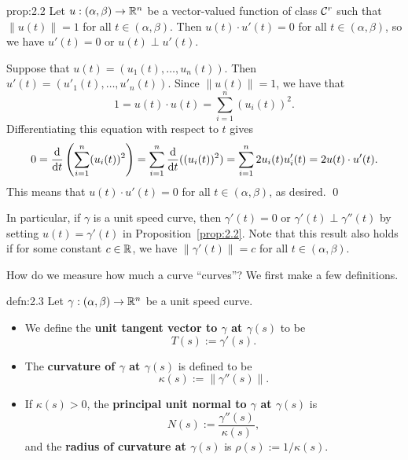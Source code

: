 \begin{prop}{prop:2.2}
    Let $u : (\alpha, \beta) \to \mathbb{R}^n$ be a vector-valued function of class ${\cal C}^r$ 
    such that $\|u(t)\| = 1$ for all $t \in (\alpha, \beta)$. Then 
    $u(t) \cdot u'(t) = 0$ for all $t \in (\alpha, \beta)$, so
    we have $u'(t) = 0$ or $u(t) \perp u'(t)$.
\end{prop}\vspace{-0.25cm} 
\begin{pf}
    Suppose that $u(t) = (u_1(t), \dots, u_n(t))$. Then 
    $u'(t) = (u'_1(t), \dots, u'_n(t))$. Since $\|u(t)\| = 1$, we have that 
    \[ 1 = u(t) \cdot u(t) = \sum_{i=1}^n (u_i(t))^2. \]
    Differentiating this equation with respect to $t$ gives 
    \begin{align*}
        0 = \frac{\rm d}{{\rm d}t} \left( \sum_{i=1}^n (u_i(t))^2 \right)
        = \sum_{i=1}^n \frac{\rm d}{{\rm d}t} ((u_i(t))^2) 
        = \sum_{i=1}^n 2u_i(t)u'_i(t) = 2u(t) \cdot u'(t). 
    \end{align*}
    This means that $u(t) \cdot u'(t) = 0$ for all $t \in (\alpha, \beta)$, 
    as desired. \qed 
\end{pf}\vspace{-0.25cm} 

In particular, if $\gamma$ is a unit speed curve, then $\gamma'(t) = 0$ 
or $\gamma'(t) \perp \gamma''(t)$ by setting $u(t) = \gamma'(t)$ in 
Proposition~\ref{prop:2.2}. Note that this result also holds if for 
some constant $c \in \mathbb{R}$, we have $\|\gamma'(t)\| = c$ for all $t \in (\alpha, \beta)$.

How do we measure how much a curve ``curves''? We first make a few definitions.

\begin{defn}{defn:2.3}
    Let $\gamma : (\alpha, \beta) \to \mathbb{R}^n$ be a unit speed curve. 
    \begin{itemize}
        \item We define the {\bf unit tangent vector to $\gamma$ at $\gamma(s)$} 
        to be 
        \[ T(s) := \gamma'(s). \] 
        \item The {\bf curvature of $\gamma$ at $\gamma(s)$} is defined to be 
        \[ \kappa(s) := \|\gamma''(s)\|. \] 
        \item If $\kappa(s) > 0$, the {\bf principal unit normal to $\gamma$ 
        at $\gamma(s)$} is 
        \[ N(s) := \frac{\gamma''(s)}{\kappa(s)}, \] 
        and the {\bf radius of curvature at $\gamma(s)$} is $\rho(s) := 1/\kappa(s)$. 
    \end{itemize}
\end{defn}

